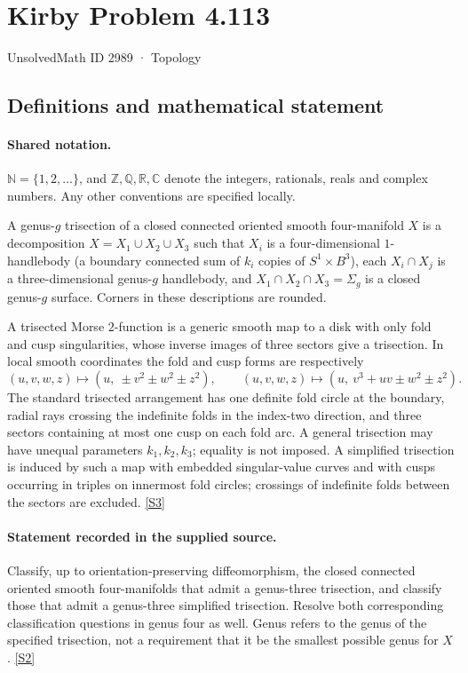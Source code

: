 \documentclass[11pt]{article}
\newcommand{\sref}[2]{\hyperlink{source:#1:#2}{[S#2]}}
\begin{document}
\setcounter{section}{2988}
\section{Kirby Problem 4.113}\label{2989}
{\small\sffamily UnsolvedMath ID 2989 · Topology}
\subsection{Definitions and mathematical statement}

\paragraph{Shared notation.}$\mathbb N=\{1,2,\ldots\}$, and $\mathbb Z,\mathbb Q,\mathbb R,\mathbb C$ denote the integers, rationals, reals and complex numbers. Any other conventions are specified locally.


A genus-$g$ trisection of a closed connected oriented smooth four-manifold $X$ is a decomposition $X=X_1\cup X_2\cup X_3$ such that $X_i$ is a four-dimensional $1$-handlebody (a boundary connected sum of $k_i$ copies of $S^1\times B^3$), each $X_i\cap X_j$ is a three-dimensional genus-$g$ handlebody, and $X_1\cap X_2\cap X_3=\Sigma_g$ is a closed genus-$g$ surface. Corners in these descriptions are rounded.

A trisected Morse $2$-function is a generic smooth map to a disk with only fold and cusp singularities, whose inverse images of three sectors give a trisection. In local smooth coordinates the fold and cusp forms are respectively
\[
 (u,v,w,z)\mapsto(u,\ \pm v^2\pm w^2\pm z^2),\qquad
 (u,v,w,z)\mapsto(u,\ v^3+uv\pm w^2\pm z^2).
\]
The standard trisected arrangement has one definite fold circle at the boundary, radial rays crossing the indefinite folds in the index-two direction, and three sectors containing at most one cusp on each fold arc. A general trisection may have unequal parameters $k_1,k_2,k_3$; equality is not imposed. A simplified trisection is induced by such a map with embedded singular-value curves and with cusps occurring in triples on innermost fold circles; crossings of indefinite folds between the sectors are excluded. \sref{2989}{3}
\paragraph{Statement recorded in the supplied source.}
Classify, up to orientation-preserving diffeomorphism, the closed connected oriented smooth four-manifolds that admit a genus-three trisection, and classify those that admit a genus-three simplified trisection. Resolve both corresponding classification questions in genus four as well. Genus refers to the genus of the specified trisection, not a requirement that it be the smallest possible genus for $X$. \sref{2989}{2}
\end{document}
